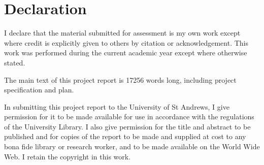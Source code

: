


\chapter*{Declaration}

I declare that the material submitted for assessment is my own work except
where credit is explicitly given to others by citation or acknowledgement. This
work was performed during the current academic year except where otherwise
stated.

The main text of this project report is 17256 words long, including project
specification and plan.

In submitting this project report to the University of St Andrews, I give
permission for it to be made available for use in accordance with the
regulations of the University Library. I also give permission for the title and
abstract to be published and for copies of the report to be made and supplied
at cost to any bona fide library or research worker, and to be made available
on the World Wide Web. I retain the copyright in this work.


